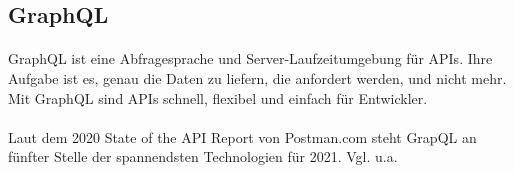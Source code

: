\subsection{GraphQL}
\paragraph{}
GraphQL ist eine Abfragesprache und Server-Laufzeitumgebung für APIs.
Ihre Aufgabe ist es, genau die Daten zu liefern, die anfordert werden, und nicht mehr.
\\
Mit GraphQL sind APIs schnell, flexibel und einfach für Entwickler.
\\ \\
Laut dem 2020 State of the API Report von Postman.com steht GrapQL an fünfter Stelle der spannendsten Technologien für 2021.
{Vgl. u.a. \cite{PM1}}

